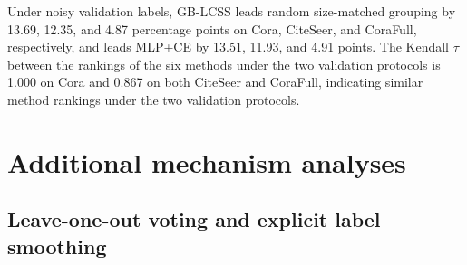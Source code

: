 \documentclass[10pt,letterpaper]{elsarticle}
\begin{document}
Under noisy validation labels, GB-LCSS leads random size-matched grouping by 13.69, 12.35, and 4.87 percentage points on Cora, CiteSeer, and CoraFull, respectively, and leads MLP+CE by 13.51, 11.93, and 4.91 points. The Kendall \(\tau\) between the rankings of the six methods under the two validation protocols is 1.000 on Cora and 0.867 on both CiteSeer and CoraFull, indicating similar method rankings under the two validation protocols.

\Needspace{307pt}

\FloatBarrier
\setcounter{table}{0}
\section{Additional mechanism analyses}\label{sec:D}

\Needspace{307pt}

\subsection{Leave-one-out voting and explicit label smoothing}\label{sec:D.1}
\end{document}
